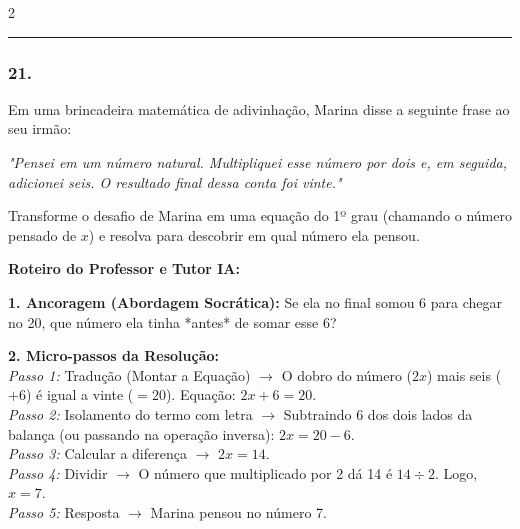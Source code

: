 \begin{multicols*}{2}
\par\vspace{\espacoQuestao}

\noindent\textcolor{CorLinha}{\rule{\linewidth}{0.5pt}} 
\par\vspace{\espacoPreQuestao}
\subsubsection*{21.} 
\begin{enunciadoLiteral}
Em uma brincadeira matemática de adivinhação, Marina disse a seguinte frase ao seu irmão: 

\textit{"Pensei em um número natural. Multipliquei esse número por dois e, em seguida, adicionei seis. O resultado final dessa conta foi vinte."}

Transforme o desafio de Marina em uma equação do 1º grau (chamando o número pensado de $x$) e resolva para descobrir em qual número ela pensou.
\end{enunciadoLiteral}

\ifgabarito
    \begin{tcolorbox}[colback=CorTitUm!5, colframe=CorTitUm, boxrule=1pt, arc=4pt, left=6pt, right=6pt, top=6pt, bottom=6pt]
    \small\textbf{\textcolor{CorTitUm}{Roteiro do Professor e Tutor IA:}}\par\vspace{0.1cm}
    \color{CinzaEscuro}
    \textbf{1. Ancoragem (Abordagem Socrática):} Se ela no final somou 6 para chegar no 20, que número ela tinha *antes* de somar esse 6?\par\vspace{0.1cm}
    
    \textbf{2. Micro-passos da Resolução:}\\
    \textit{Passo 1:} Tradução (Montar a Equação) $\rightarrow$ O dobro do número ($2x$) mais seis ($+ 6$) é igual a vinte ($= 20$). Equação: $ 2x + 6 = 20 $.\\
    \textit{Passo 2:} Isolamento do termo com letra $\rightarrow$ Subtraindo 6 dos dois lados da balança (ou passando na operação inversa): $ 2x = 20 - 6 $.\\
    \textit{Passo 3:} Calcular a diferença $\rightarrow$ $ 2x = 14 $.\\
    \textit{Passo 4:} Dividir $\rightarrow$ O número que multiplicado por 2 dá 14 é $ 14 \div 2 $. Logo, $ x = 7 $.\\
    \textit{Passo 5:} Resposta $\rightarrow$ Marina pensou no número 7.\par\vspace{0.1cm}
    

\end{tcolorbox}
\end{multicols*}
